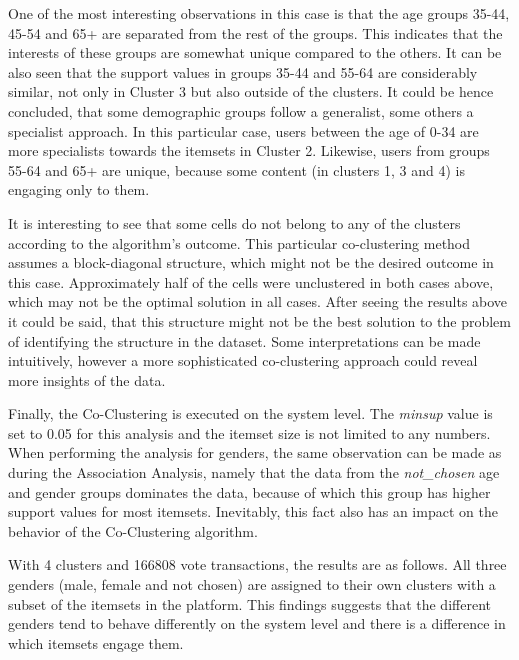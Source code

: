 One of the most interesting observations in this case is that the age groups 35-44, 45-54 and 65+ are separated from the rest of the groups. This indicates that the interests of these groups are somewhat unique compared to the others. It can be also seen that the support values in groups 35-44 and 55-64 are considerably similar, not only in Cluster 3 but also outside of the clusters. It could be hence concluded, that some demographic groups follow a generalist, some others a specialist approach. In this particular case, users between the age of 0-34 are more specialists towards the itemsets in Cluster 2. Likewise, users from groups 55-64 and 65+ are unique, because some content (in clusters 1, 3 and 4) is engaging only to them. 

It is interesting to see that some cells do not belong to any of the clusters according to the algorithm's outcome. This particular co-clustering method assumes a block-diagonal structure, which might not be the desired outcome in this case. Approximately half of the cells were unclustered in both cases above, which may not be the optimal solution in all cases. After seeing the results above it could be said, that this structure might not be the best solution to the problem of identifying the structure in the dataset. Some interpretations can be made intuitively, however a more sophisticated co-clustering approach could reveal more insights of the data.


Finally, the Co-Clustering is executed on the system level. The \emph{minsup} value is set to 0.05 for this analysis and the itemset size is not limited to any numbers. When performing the analysis for genders, the same observation can be made as during the Association Analysis, namely that the data from the \emph{not\_chosen} age and gender groups dominates the data, because of which this group has higher support values for most itemsets. Inevitably, this fact also has an impact on the behavior of the Co-Clustering algorithm. 

With 4 clusters and 166808 vote transactions, the results are as follows. All three genders (male, female and not chosen) are assigned to their own clusters with a subset of the itemsets in the platform. This findings suggests that the different genders tend to behave differently on the system level and there is a difference in which itemsets engage them. 

